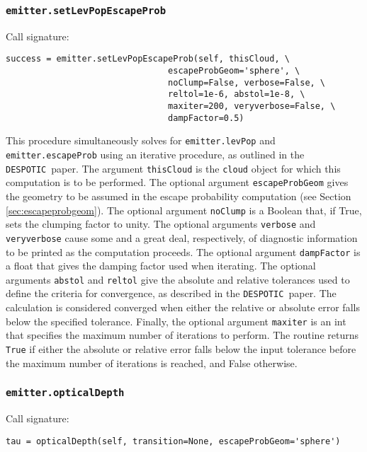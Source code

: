 \documentclass[12pt]{article}
\newcommand{\despotic}{\texttt{DESPOTIC}}
\begin{document}
\subsubsection{\texttt{emitter.setLevPopEscapeProb}}
\label{sec:setlevpopescapeprob}

Call signature:

\begin{verbatim}
success = emitter.setLevPopEscapeProb(self, thisCloud, \
                                escapeProbGeom='sphere', \
                                noClump=False, verbose=False, \
                                reltol=1e-6, abstol=1e-8, \
                                maxiter=200, veryverbose=False, \
                                dampFactor=0.5)
\end{verbatim}

This procedure simultaneously solves for \verb=emitter.levPop= and \verb=emitter.escapeProb= using an iterative procedure, as outlined in the \despotic\ paper. The argument \verb=thisCloud= is the \verb=cloud= object for which this computation is to be performed. The optional argument \verb=escapeProbGeom= gives the geometry to be assumed in the escape probability computation (see Section \ref{sec:escapeprobgeom}). The optional argument \verb=noClump= is a Boolean that, if True, sets the clumping factor to unity. The optional arguments \verb=verbose= and \verb=veryverbose= cause some and a great deal, respectively, of diagnostic information to be printed as the computation proceeds. The optional argument \verb=dampFactor= is a float that gives the damping factor used when iterating. The optional arguments \verb=abstol= and \verb=reltol= give the absolute and relative tolerances used to define the criteria for convergence, as described in the \despotic\ paper. The calculation is considered converged when either the relative or absolute error falls below the specified tolerance. Finally, the optional argument \verb=maxiter= is an int that specifies the maximum number of iterations to perform. The routine returns \verb=True= if either the absolute or relative error falls below the input tolerance before the maximum number of iterations is reached, and False otherwise.

\subsubsection{\texttt{emitter.opticalDepth}}

Call signature:

\begin{verbatim}
tau = opticalDepth(self, transition=None, escapeProbGeom='sphere')
\end{verbatim}
\end{document}
